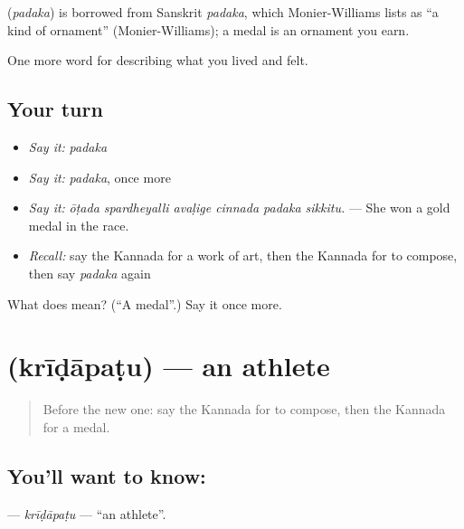 \begin{cousinweb}
\textbf{} (\emph{padaka}) is borrowed from Sanskrit \emph{padaka}, which Monier-Williams lists as \textquotedblleft{}a kind of ornament\textquotedblright{} (Monier-Williams); a medal is an ornament you earn.
\end{cousinweb}

\begin{grammarlens}[title={What you've built}]
One more word for describing what you lived and felt.
\end{grammarlens}

\subsection*{Your turn}
\begin{itemize}
\raggedright
  \item \emph{Say it:} \emph{padaka}
  \item \emph{Say it:} \emph{padaka}, once more
  \item \emph{Say it:} \emph{ōṭada spardheyalli avaḷige cinnada padaka sikkitu.} — She won a gold medal in the race.
  \item \emph{Recall:} say the Kannada for a work of art, then the Kannada for to compose, then say \emph{padaka} again
\end{itemize}

\begin{tcolorbox}[breakable,colback=teal!4,colframe=teal!35!black,title={Before you move on}]
What does  mean? (\textquotedblleft{}A medal\textquotedblright{}.) Say it once more.
\end{tcolorbox}
\section[\texorpdfstring{\kn{ಕ್ರೀಡಾಪಟು} (krīḍāpaṭu)}{ಕ್ರೀಡಾಪಟು (krīḍāpaṭu)}]{ (krīḍāpaṭu) — an athlete}

\label{lesson:KA-C538-kridapatu}



\begin{quote}
Before the new one: say the Kannada for to compose, then the Kannada for a medal.
\end{quote}

\subsection*{You'll want to know: }
\textbf{} — \emph{krīḍāpaṭu} — \textquotedblleft{}an athlete\textquotedblright{}.


